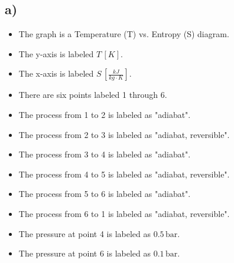 

\subsection*{a)}

\begin{itemize}
    \item The graph is a Temperature (T) vs. Entropy (S) diagram.
    \item The y-axis is labeled \( T \, [K] \).
    \item The x-axis is labeled \( S \, \left[ \frac{kJ}{kg \cdot K} \right] \).
    \item There are six points labeled 1 through 6.
    \item The process from 1 to 2 is labeled as "adiabat".
    \item The process from 2 to 3 is labeled as "adiabat, reversible".
    \item The process from 3 to 4 is labeled as "adiabat".
    \item The process from 4 to 5 is labeled as "adiabat, reversible".
    \item The process from 5 to 6 is labeled as "adiabat".
    \item The process from 6 to 1 is labeled as "adiabat, reversible".
    \item The pressure at point 4 is labeled as \( 0.5 \, \text{bar} \).
    \item The pressure at point 6 is labeled as \( 0.1 \, \text{bar} \).
\end{itemize}